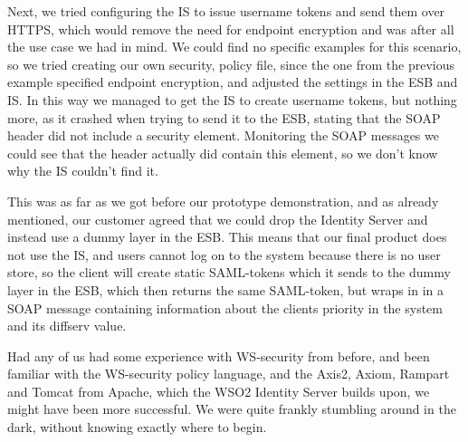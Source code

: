     Next, we tried configuring the IS to issue username tokens and send them over HTTPS, which would remove the need for endpoint encryption and was after all the use case we had in mind. We could find no specific examples for this scenario, so we tried creating our own security, policy file, since the one from the previous example specified endpoint encryption, and adjusted the settings in the ESB and IS. In this way we managed to get the IS to create username tokens, but nothing more, as it crashed when trying to send it to the ESB, stating that the SOAP header did not include a security element. Monitoring the SOAP messages we could see that the header actually did contain this element, so we don't know why the IS couldn't find it.

    This was as far as we got before our prototype demonstration, and as already mentioned, our customer agreed that we could drop the Identity Server and instead use a dummy layer in the ESB. This means that our final product does not use the IS, and users cannot log on to the system because there is no user store, so the client will create static SAML-tokens which it sends to the dummy layer in the ESB, which then returns the same SAML-token, but wraps in in a SOAP message containing information about the clients priority in the system and its diffserv value.

    Had any of us had some experience with WS-security from before, and been familiar with the WS-security policy language, and the Axis2, Axiom, Rampart and Tomcat from Apache, which the WSO2 Identity Server builds upon,  we might have been more successful. We were quite frankly stumbling around in the dark, without knowing exactly where to begin.




